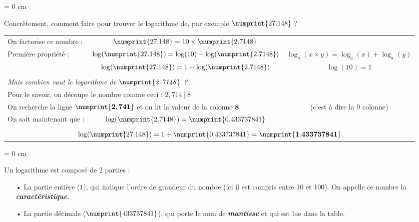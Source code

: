 \documentclass[a4paper]{article}
\begin{document}
{ \parindent = 0 cm

Concrètement, comment faire pour trouver le logarithme de, par exemple $\numprint{27.148}$ ?

\vspace{0.2 cm}

\begin{tabular}{lc|c}

On factorise ce nombre : & $\numprint{27.148} = 10 \times \numprint{2.7148}$ & \\


Première propriété : & $\log(\numprint{27.148}) = \log(10) + \log(\numprint{2.7148})$ & $ \log_a ( x \times y ) = \log_a (x) + \log_a (y) $\\

& $\log(\numprint{27.148}) =1 + \log(\numprint{2.7148})$ & $ \log (10) = 1 $\\

&& \\

\multicolumn{2}{l|}{ \textit{Mais combien vaut le logarithme de $\mathit{\numprint{2.7148}}$ ?} } &\\


\multicolumn{2}{l|}{ Pour le savoir, on découpe le nombre comme ceci : $2,714~|~8$} & \\



\multicolumn{2}{l|}{On recherche la ligne $\mathbf{\numprint{2,741}}$ et on lit la valeur de la colonne $\mathbf{8}$} & (c'est à dire la 9\up{ème} colonne)\\


On sait maintenant que : & $\log (\numprint{2.7148}) = \numprint{0.433 737 841}$ & \\

\multicolumn{3}{c}{} \\

\multicolumn{3}{c}{\large $\log(\numprint{27.148}) = 1 + \numprint{0.433 737 841} = \mathbf{\numprint{1.433 737 841}} $}\\

\end{tabular}
}

\vspace{0.3 cm}

{ \parindent = 0 cm

Un logarithme est composé de 2 parties :

\begin{itemize}

	\vspace{0.1 cm}

	\item[•] La partie entière ($1$), qui indique l'ordre de grandeur du nombre (ici il est compris entre 10 et 100). On appelle ce nombre la \textbf{\textit{caractéristique}}.

	\vspace{0.1 cm}

	\item[•] La partie décimale ($\numprint{433 737 841}$), qui porte le nom de \textbf{\textit{mantisse}} et qui est lue dans la table.

\end{itemize}
}
\end{document}
